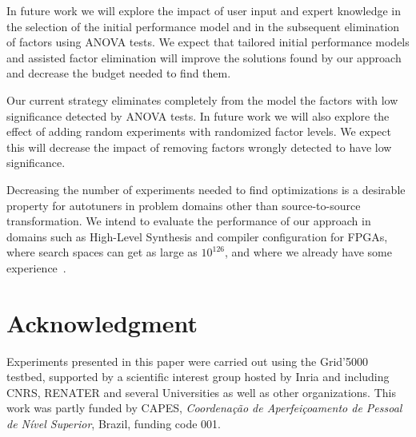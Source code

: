 \documentclass[conference]{IEEEtran}
\begin{document}
In future work we will explore the  impact of user input and expert knowledge in
the selection of the initial performance model and in the subsequent elimination
of factors using ANOVA tests. We expect that tailored initial performance models
and assisted factor elimination will improve the solutions found by our approach
and decrease the budget needed to find them.

Our current strategy  eliminates completely from the model the  factors with low
significance detected  by ANOVA tests. In  future work we will  also explore the
effect of  adding random  experiments with randomized  factor levels.  We expect
this will decrease  the impact of removing factors wrongly  detected to have low
significance.

Decreasing the number of experiments needed to find optimizations is a desirable
property  for   autotuners  in  problem  domains   other  than  source-to-source
transformation. We intend to evaluate the performance of our approach in domains
such as High-Level Synthesis and  compiler configuration for FPGAs, where search
spaces  can  get   as  large  as  \(10^{126}\),  and  where   we  already  have  some
experience~\cite{bruel2017autotuninghls}.
\section*{Acknowledgment}
\label{sec:org1ce9772}
Experiments  presented  in this  paper  were  carried  out using  the  Grid'5000
testbed, supported by a scientific interest  group hosted by Inria and including
CNRS, RENATER  and several  Universities as well  as other  organizations.  This
work was  partly funded by CAPES,  \emph{Coordenação de Aperfeiçoamento de  Pessoal de
Nível Superior}, Brazil, funding code 001.



\end{document}
